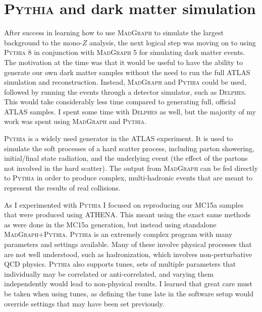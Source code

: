 \section{\textsc{Pythia} and dark matter simulation}
\label{sec:pythia}

After success in learning how to use \textsc{MadGraph} to simulate the largest background to the mono-$Z$ analysis, the next logical step was moving on to using \textsc{Pythia 8} in conjunction with \textsc{MadGraph 5} for simulating dark matter events. The motivation at the time was that it would be useful to have the ability to generate our own dark matter samples without the need to run the full ATLAS simulation and reconstruction. Instead, \textsc{MadGraph} and \textsc{Pythia} could be used, followed by running the events through a detector simulator, such as \textsc{Delphes}. This would take considerably less time compared to generating full, official ATLAS samples. I spent some time with \textsc{Delphes} as well, but the majority of my work was spent using \textsc{MadGraph} and \textsc{Pythia}.

\textsc{Pythia} \cite{Sjostrand:2014zea} is a widely used generator in the ATLAS experiment. It is used to simulate the soft processes of a hard scatter process, including parton showering, initial/final state radiation, and the underlying event (the effect of the partons not involved in the hard scatter). The output from \textsc{MadGraph} can be fed directly to \textsc{Pythia} in order to produce complex, multi-hadronic events that are meant to represent the results of real collisions.

As I experimented with \textsc{Pythia} I focused on reproducing our MC15a samples that were produced using ATHENA. This meant using the exact same methods as were done in the MC15a generation, but instead using standalone \textsc{MadGraph}+\textsc{Pythia}. \textsc{Pythia} is an extremely complex program with many parameters and settings available. Many of these involve physical processes that are not well understood, such as hadronization, which involves non-perturbative QCD physics. \textsc{Pythia} also supports tunes, sets of multiple parameters that individually may be correlated or anti-correlated, and varying them independently would lead to non-physical results. I learned that great care must be taken when using tunes, as defining the tune late in the software setup would override settings that may have been set previously. 

